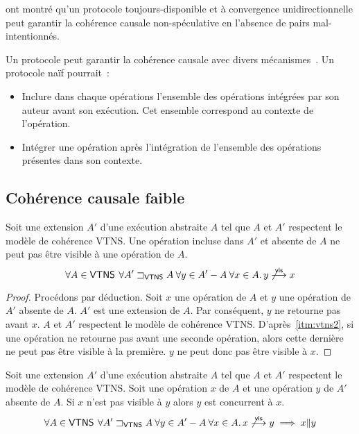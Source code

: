 \textcite{mahajan_2011_cac} ont montré qu'un protocole toujours-disponible et à convergence unidirectionnelle peut garantir la cohérence causale non-spéculative en l'absence de pairs mal-intentionnés.

Un protocole peut garantir la cohérence causale avec divers mécanismes~\autocite{lamport_1978_time,fidge_1987_timestamps,prakash_1997_barrierbarrier}.
Un protocole naïf pourrait~:

\begin{itemize}
    \item Inclure dans chaque opérations l'ensemble des opérations intégrées par son auteur avant son exécution.
    Cet ensemble correspond au contexte de l'opération.
    \item Intégrer une opération après l'intégration de l'ensemble des opérations présentes dans son contexte.
\end{itemize}


\subsection{Cohérence causale faible}

\begin{proposition}\label{th:future-vis}
Soit une extension $A'$ d'une exécution abstraite $A$ tel que $A$ et $A'$ respectent le modèle de cohérence \ac{VTNS}.
Une opération incluse dans $A'$ et absente de $A$ ne peut pas être visible à une opération de $A$.
\begin{equation*}
    \forall A \in \operatorname{\mathsf{VTNS}} \:\forall A' \sqsupset_{\operatorname{\mathsf{VTNS}}} A \:\forall y \in A'- A \:\forall x \in A \ldotp y \not\overset{\mathsf{vis}}{\longrightarrow} x
\end{equation*}
\end{proposition}

\begin{proof}
Procédons par déduction.
Soit $x$ une opération de $A$ et $y$ une opération de $A'$ absente de $A$.
$A'$ est une extension de $A$.
Par conséquent, $y$ ne retourne pas avant $x$.
$A$ et $A'$ respectent le modèle de cohérence \ac{VTNS}.
D'après~\ref{itm:vtns2}, si une opération ne retourne pas avant une seconde opération, alors cette dernière ne peut pas être visible à la première.
$y$ ne peut donc pas être visible à $x$.
\end{proof}

\begin{corollary}\label{th:future-concur}
Soit une extension $A'$ d'une exécution abstraite $A$ tel que $A$ et $A'$ respectent le modèle de cohérence \ac{VTNS}.
Soit une opération $x$ de $A$ et une opération $y$ de $A'$ absente de $A$.
Si $x$ n'est pas visible à $y$ alors $y$ est concurrent à $x$.
\begin{equation*}
    \forall A \in \operatorname{\mathsf{VTNS}} \:\forall A' \sqsupset_{\operatorname{\mathsf{VTNS}}} A \:\forall y \in A'- A \:\forall x \in A \ldotp x \not\overset{\mathsf{vis}}{\longrightarrow} y \implies x \| y
\end{equation*}
\end{corollary}


